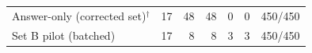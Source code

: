 \begin{table}[t]
{\begin{tabular}{lrrrrrr}
Answer-only (corrected set)$^{\dagger}$ & 17 & 48 & 48 & 0 & 0 & 450/450 \\
Set B pilot (batched) & 17 & 8 & 8 & 3 & 3 & 450/450 \\

\end{tabular}}
\end{table}
